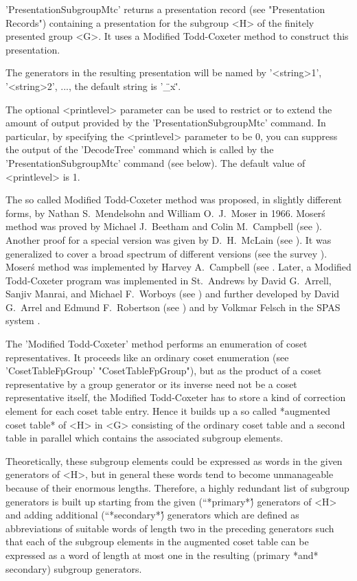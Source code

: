 'PresentationSubgroupMtc'    returns    a   presentation   record    (see
"Presentation Records") containing a presentation for the subgroup <H> of
the  finitely  presented  group  <G>.  It  uses a  Modified  Todd-Coxeter
method to construct this presentation.%

The  generators  in   the   resulting  presentation  will  be  named   by
'<string>1', '<string>2', ..., the default string is '\"\_x\"'.

The optional <printlevel> parameter can be used to restrict  or to extend
the amount of  output provided by the 'PresentationSubgroupMtc'  command.
In particular, by specifying the <printlevel> parameter to be  0, you can
suppress the output of  the 'DecodeTree' command which is called  by  the
'PresentationSubgroupMtc'  command (see  below).  The  default  value  of
<printlevel> is 1.

The  so  called  Modified  Todd-Coxeter  method was proposed, in slightly
different forms, by Nathan S.~Mendelsohn and William O.~J.~Moser in 1966.
Moser\'s  method  was proved by  Michael J.~Beetham and Colin M.~Campbell
(see \cite{BC76}).  Another  proof  for a  special version  was  given by
D.~H.~McLain (see  \cite{McL77}).  It  was generalized  to cover  a broad
spectrum  of different versions (see the  survey \cite{Neu82}).  Moser\'s
method was implemented by Harvey A.~Campbell (see \cite{Cam71}.  Later, a
Modified Todd-Coxeter program was  implemented in  St.~Andrews  by  David
G.~Arrell, Sanjiv Manrai, and Michael  F.~Worboys (see \cite{AMW82})  and
further  developed   by  David  G.~Arrel  and  Edmund  F.~Robertson  (see
\cite{AR84}) and by Volkmar Felsch in the SPAS system \cite{Spa89}.

The  'Modified Todd-Coxeter'  method  performs  an enumeration  of  coset
representatives.   It  proceeds like an  ordinary  coset enumeration (see
'CosetTableFpGroup' "CosetTableFpGroup"), but as  the product of  a coset
representative by  a group  generator or its inverse need not be a  coset
representative itself, the Modified Todd-Coxeter has to store a  kind  of
correction element for each coset table entry.   Hence it builds  up a so
called *augmented coset table* of <H>  in <G> consisting  of the ordinary
coset table and a second  table in parallel which contains the associated
subgroup elements.%

Theoretically, these subgroup elements could be expressed as words in the
given generators of   <H>, but in    general these words tend   to become
unmanageable  because of their   enormous lengths.   Therefore,  a highly
redundant list of subgroup generators is built up starting from the given
(``*primary*\'\')  generators     of    <H>   and     adding   additional
(``*secondary*\'\')  generators which  are  defined as   abbreviations of
suitable words of length  two in the  preceding generators such that each
of the subgroup elements in the augmented coset table can be expressed as
a word of length at most  one in the  resulting (primary *and* secondary)
subgroup generators.%
%

